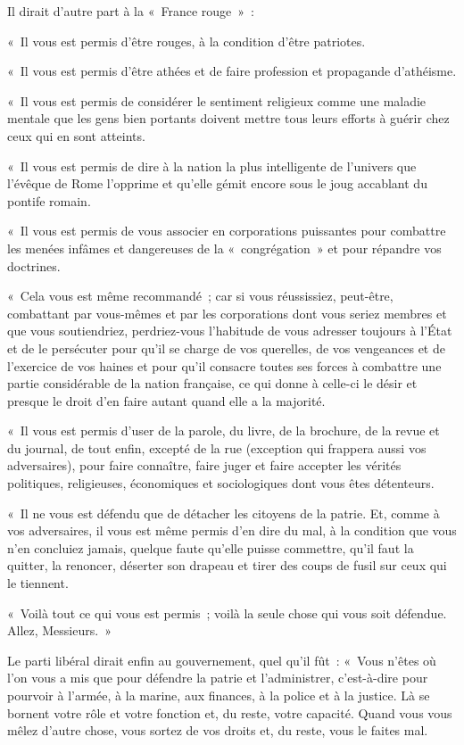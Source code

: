 \documentclass[french,twoside]{book} %
\newcommand{\astertri}{\medskip\par\centerline{\color{rubric}\large\selectfont{\syms ✻\,✻\,✻}}\medskip\par}%
\begin{document}
\astertri

\noindent Il dirait d’autre part à la « France rouge » :\par
« Il vous est permis d’être rouges, à la condition d’être patriotes.\par
« Il vous est permis d’être athées et de faire profession et propagande d’athéisme.\par
« Il vous est permis de considérer le sentiment religieux comme une maladie mentale que les gens bien portants doivent mettre tous leurs efforts à guérir chez ceux qui en sont atteints.\par
« Il vous est permis de dire à la nation la plus intelligente de l’univers que l’évêque de Rome l’opprime et qu’elle gémit encore sous le joug accablant du pontife romain.\par
« Il vous est permis de vous associer en corporations puissantes pour combattre les menées infâmes et dangereuses de la « congrégation » et pour répandre vos doctrines.\par
 « Cela vous est même recommandé ; car si vous réussissiez, peut-être, combattant par vous-mêmes et par les corporations dont vous seriez membres et que vous soutiendriez, perdriez-vous l’habitude de vous adresser toujours à l’État et de le persécuter pour qu’il se charge de vos querelles, de vos vengeances et de l’exercice de vos haines et pour qu’il consacre toutes ses forces à combattre une partie considérable de la nation française, ce qui donne à celle-ci le désir et presque le droit d’en faire autant quand elle a la majorité.\par
« Il vous est permis d’user de la parole, du livre, de la brochure, de la revue et du journal, de tout enfin, excepté de la rue (exception qui frappera aussi vos adversaires), pour faire connaître, faire juger et faire accepter les vérités politiques, religieuses, économiques et sociologiques dont vous êtes détenteurs.\par
« Il ne vous est défendu que de détacher les citoyens de la patrie. Et, comme à vos adversaires, il vous est même permis d’en dire du mal, à la condition que vous n’en concluiez jamais, quelque faute qu’elle puisse commettre, qu’il faut la quitter, la renoncer, déserter son drapeau et tirer des coups de fusil sur ceux qui le tiennent.\par
« Voilà tout ce qui vous est permis ; voilà la seule chose qui vous soit défendue. Allez, Messieurs. »\par
 Le parti libéral dirait enfin au gouvernement, quel qu’il fût : « Vous n’êtes où l’on vous a mis que pour défendre la patrie et l’administrer, c’est-à-dire pour pourvoir à l’armée, à la marine, aux finances, à la police et à la justice. Là se bornent votre rôle et votre fonction et, du reste, votre capacité. Quand vous vous mêlez d’autre chose, vous sortez de vos droits et, du reste, vous le faites mal.\par
\end{document}
